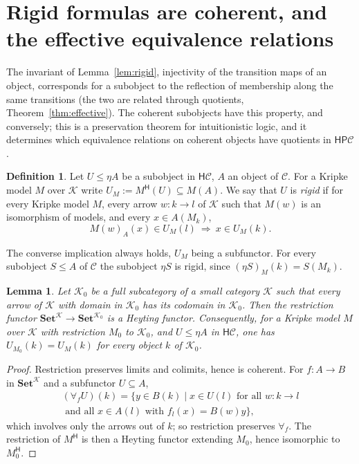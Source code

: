 \documentclass[11pt]{amsart}
\newtheorem{lem}[thm]{Lemma}
\theoremstyle{definition}
\newtheorem{defi}[thm]{Definition}
\newcommand{\Set}{\mathbf{Set}}
\newcommand{\PP}{\mathsf P}
\newcommand{\HH}{\mathsf H}
\newcommand{\cC}{\mathcal C}
\newcommand{\cK}{\mathcal K}
\begin{document}
\section{Rigid formulas are coherent, and the effective equivalence relations}

The invariant of Lemma~\ref{lem:rigid}, injectivity of the transition
maps of an object, corresponds for a subobject to the reflection of
membership along the same transitions (the two are related through
quotients, Theorem~\ref{thm:effective}). The coherent subobjects have
this property, and conversely; this
is a preservation theorem for intuitionistic logic, and it
determines which equivalence relations on coherent objects have
quotients in $\HH\PP\cC$.

\begin{defi}\label{def:rigid}
Let $U\le\eta A$ be a subobject in $\HH\cC$, $A$ an object of $\cC$.
For a Kripke model $M$ over $\cK$ write $U_M:=M^{\HH}(U)\subseteq M(A)$.
We say that $U$ is \emph{rigid} if for every Kripke model $M$, every
arrow $w\colon k\to l$ of $\cK$ such that $M(w)$ is an isomorphism of
models, and every $x\in A(M_k)$,
\[
M(w)_A(x)\in U_M(l)\ \Longrightarrow\ x\in U_M(k).
\]
\end{defi}

The converse implication always holds, $U_M$ being a subfunctor. For
every subobject $S\le A$ of $\cC$ the subobject $\eta S$ is rigid,
since $(\eta S)_M(k)=S(M_k)$.

\begin{lem}\label{lem:cosieve}
Let $\cK_0$ be a full subcategory of a small category $\cK$ such that
every arrow of $\cK$ with domain in $\cK_0$ has its codomain in
$\cK_0$. Then the restriction functor $\Set^{\cK}\to\Set^{\cK_0}$ is a
Heyting functor. Consequently, for a Kripke model $M$ over $\cK$ with
restriction $M_0$ to $\cK_0$, and $U\le\eta A$ in $\HH\cC$, one has
$U_{M_0}(k)=U_M(k)$ for every object $k$ of $\cK_0$.
\end{lem}
\begin{proof}
Restriction preserves limits and colimits, hence is coherent. For
$f\colon A\to B$ in $\Set^{\cK}$ and a subfunctor $U\subseteq A$,
\begin{multline*}
(\forall_fU)(k)=\{y\in B(k)\mid x\in U(l)\text{ for all }w\colon k\to
l\\\text{ and all }x\in A(l)\text{ with }f_l(x)=B(w)y\},
\end{multline*}
which involves only the arrows out of $k$; so restriction preserves
$\forall_f$. The restriction of $M^{\HH}$ is then a Heyting functor
extending $M_0$, hence isomorphic to $M_0^{\HH}$.
\end{proof}
\end{document}
